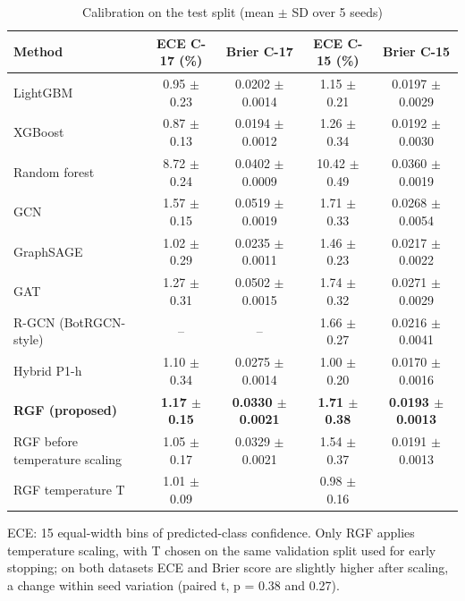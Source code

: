 \begin{table}[!t]
\centering
\caption{Calibration on the test split (mean $\pm$ SD over 5 seeds)}
\label{tab:calibration}
\footnotesize
\setlength{\tabcolsep}{3pt}
\begin{tabular}{lcccc}
\hline
\textbf{Method} & \textbf{ECE C-17 (\%)} & \textbf{Brier C-17} & \textbf{ECE C-15 (\%)} & \textbf{Brier C-15} \\
\hline
LightGBM & 0.95 $\pm$ 0.23 & 0.0202 $\pm$ 0.0014 & 1.15 $\pm$ 0.21 & 0.0197 $\pm$ 0.0029 \\
XGBoost & 0.87 $\pm$ 0.13 & 0.0194 $\pm$ 0.0012 & 1.26 $\pm$ 0.34 & 0.0192 $\pm$ 0.0030 \\
Random forest & 8.72 $\pm$ 0.24 & 0.0402 $\pm$ 0.0009 & 10.42 $\pm$ 0.49 & 0.0360 $\pm$ 0.0019 \\
GCN & 1.57 $\pm$ 0.15 & 0.0519 $\pm$ 0.0019 & 1.71 $\pm$ 0.33 & 0.0268 $\pm$ 0.0054 \\
GraphSAGE & 1.02 $\pm$ 0.29 & 0.0235 $\pm$ 0.0011 & 1.46 $\pm$ 0.23 & 0.0217 $\pm$ 0.0022 \\
GAT & 1.27 $\pm$ 0.31 & 0.0502 $\pm$ 0.0015 & 1.74 $\pm$ 0.32 & 0.0271 $\pm$ 0.0029 \\
R-GCN (BotRGCN-style) & -- & -- & 1.66 $\pm$ 0.27 & 0.0216 $\pm$ 0.0041 \\
Hybrid P1-h & 1.10 $\pm$ 0.34 & 0.0275 $\pm$ 0.0014 & 1.00 $\pm$ 0.20 & 0.0170 $\pm$ 0.0016 \\
\textbf{RGF (proposed)} & \textbf{1.17 $\pm$ 0.15} & \textbf{0.0330 $\pm$ 0.0021} & \textbf{1.71 $\pm$ 0.38} & \textbf{0.0193 $\pm$ 0.0013} \\
RGF before temperature scaling & 1.05 $\pm$ 0.17 & 0.0329 $\pm$ 0.0021 & 1.54 $\pm$ 0.37 & 0.0191 $\pm$ 0.0013 \\
RGF temperature T & 1.01 $\pm$ 0.09 &  & 0.98 $\pm$ 0.16 &  \\
\hline
\end{tabular}
\par\smallskip\parbox{\linewidth}{\scriptsize ECE: 15 equal-width bins of predicted-class confidence. Only RGF applies temperature scaling, with T chosen on the same validation split used for early stopping; on both datasets ECE and Brier score are slightly higher after scaling, a change within seed variation (paired t, p = 0.38 and 0.27).}
\end{table}